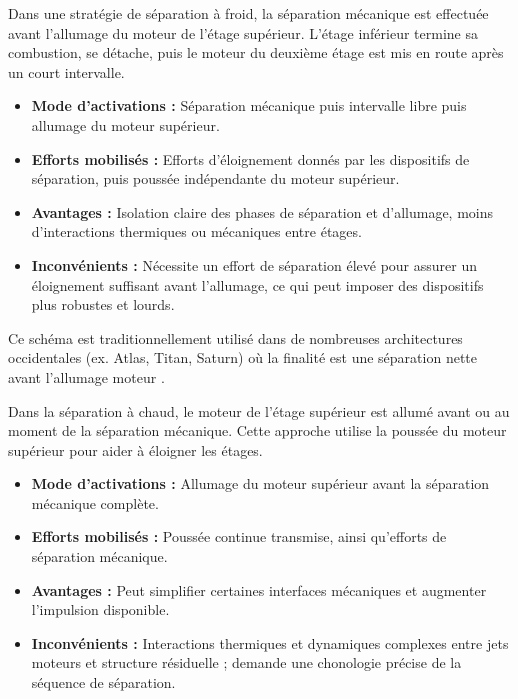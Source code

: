
Dans une stratégie de séparation à froid, la séparation mécanique est effectuée avant l’allumage du moteur de l’étage supérieur.
L’étage inférieur termine sa combustion, se détache, puis le moteur du deuxième étage est mis en route après un court intervalle.

\begin{itemize}
    \item \textbf{Mode d'activations :} Séparation mécanique puis intervalle libre puis allumage du moteur supérieur.
    \item \textbf{Efforts mobilisés :} Efforts d’éloignement donnés par les dispositifs de séparation, puis poussée indépendante
    du moteur supérieur.
    \item \textbf{Avantages :} Isolation claire des phases de séparation et d’allumage, moins d’interactions thermiques ou
    mécaniques entre étages.
    \item \textbf{Inconvénients :} Nécessite un effort de séparation élevé pour assurer un éloignement suffisant avant l’allumage, ce qui
    peut imposer des dispositifs plus robustes et lourds.\\
\end{itemize}

Ce schéma est traditionnellement utilisé dans de nombreuses architectures occidentales (ex. Atlas, Titan, Saturn) où la finalité
est une séparation nette avant l’allumage moteur \cite{Multistage_Rocket}.


Dans la séparation à chaud, le moteur de l’étage supérieur est allumé avant ou au moment de la séparation mécanique. Cette
approche utilise la poussée du moteur supérieur pour aider à éloigner les étages.\\

\begin{itemize}
    \item \textbf{Mode d'activations :} Allumage du moteur supérieur avant la séparation mécanique complète.
    \item \textbf{Efforts mobilisés :} Poussée continue transmise, ainsi qu’efforts de séparation mécanique.
    \item \textbf{Avantages :} Peut simplifier certaines interfaces mécaniques et augmenter l’impulsion disponible.
    \item \textbf{Inconvénients :} Interactions thermiques et dynamiques complexes entre jets moteurs et structure résiduelle ;
    demande une chonologie précise de la séquence de séparation.\\
\end{itemize}

